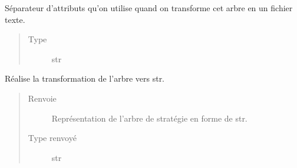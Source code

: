 \documentclass[letterpaper,10pt,french]{sphinxmanual}
\begin{document}
\begin{fulllineitems}
\begin{fulllineitems}
\begin{quote}
\begin{description}
\end{description}\end{quote}

\end{fulllineitems}


\begin{fulllineitems}
\label{\detokenize{index:StrategyTree.StrategyTree.fout_sep}}
Séparateur d’attributs qu’on utilise quand on transforme cet arbre en
un fichier texte.
\begin{quote}\begin{description}
\item[{Type}] \leavevmode
str

\end{description}\end{quote}

\end{fulllineitems}


\begin{fulllineitems}
\label{\detokenize{index:StrategyTree.StrategyTree.__str__}}
Réalise la transformation de l’arbre vers str.
\begin{quote}\begin{description}
\item[{Renvoie}] \leavevmode
{} \textendash{} Représentation de l’arbre de stratégie en forme de str.

\item[{Type renvoyé}] \leavevmode
str

\end{description}\end{quote}

\end{fulllineitems}



\end{fulllineitems}
\end{document}
